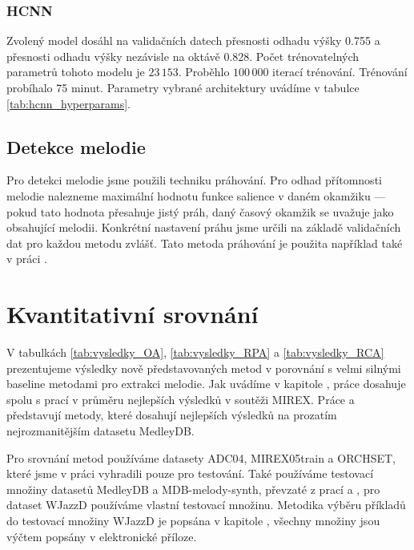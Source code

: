 \subsubsection{HCNN}

Zvolený model dosáhl na validačních datech přesnosti odhadu výšky 0.755 a přesnosti odhadu výšky nezávisle na oktávě 0.828. Počet trénovatelných parametrů tohoto modelu je $23\,153$. Proběhlo $100\,000$ iterací trénování. Trénování probíhalo 75 minut. Parametry vybrané architektury uvádíme v tabulce \ref{tab:hcnn_hyperparams}.

\subsection{Detekce melodie}

Pro detekci melodie jsme použili techniku práhování. Pro odhad přítomnosti melodie nalezneme maximální hodnotu funkce salience v daném okamžiku --- pokud tato hodnota přesahuje jistý práh, daný časový okamžik se uvažuje jako obsahující melodii. Konkrétní nastavení práhu jsme určili na základě validačních dat pro každou metodu zvlášť. Tato metoda práhování je použita například také v práci \cite{Bittner2017}.

\section{Kvantitativní srovnání}


V tabulkách \ref{tab:vysledky_OA}, \ref{tab:vysledky_RPA} a \ref{tab:vysledky_RCA} prezentujeme výsledky nově představovaných metod v porovnání s velmi silnými baseline metodami pro extrakci melodie. Jak uvádíme v kapitole , práce \cite{Salamon2012a} dosahuje spolu s prací \cite{Dressler2009} v průměru nejlepších výsledků v soutěži MIREX. Práce \cite{Bittner2017} a \cite{DBasaranSEssid2018} představují metody, které dosahují nejlepších výsledků na prozatím nejrozmanitějším datasetu MedleyDB. 

Pro srovnání metod používáme datasety ADC04, MIREX05train a ORCHSET, které jsme v práci vyhradili pouze pro testování. Také používáme testovací množiny datasetů MedleyDB a MDB-melody-synth, převzaté z prací \cite{Bittner2017} a \cite{DBasaranSEssid2018}, pro dataset WJazzD používáme vlastní testovací množinu. Metodika výběru příkladů do testovací množiny WJazzD je popsána v kapitole , všechny množiny jsou výčtem popsány v elektronické příloze.

